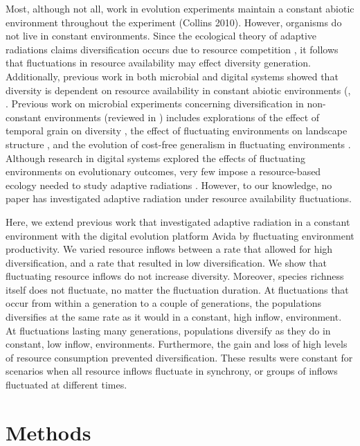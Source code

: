 \documentclass[10pt]{article}
\begin{document}
Most, although not all, work in evolution experiments maintain a constant abiotic environment throughout the experiment (Collins 2010).
However, organisms do not live in constant environments.
Since the ecological theory of adaptive radiations claims diversification occurs due to resource competition \cite{schluter2000ecological}, it follows that fluctuations in resource availability may effect diversity generation.
Additionally, previous work in both microbial and digital systems showed that diversity is dependent on resource availability in constant abiotic environments (\cite{kassen2000diversity}, \cite{chow2004adaptive}.
Previous work on microbial experiments concerning diversification in non-constant environments (reviewed in \cite{kassen2002experimental,kassen2009toward} ) includes explorations of the effect of temporal grain on diversity \cite{venail2011diversification}, the effect of fluctuating environments on landscape structure \cite{cooper2010experimental}, and the evolution of cost-free generalism in fluctuating environments \cite{buckling2007experimental}.
Although research in digital systems explored the effects of fluctuating environments on evolutionary outcomes, very few impose a resource-based ecology needed to study adaptive radiations \cite{li2004digital,clune2007investigating,misevic2010experiments}.
However, to our knowledge, no paper has investigated adaptive radiation under resource availability fluctuations.

Here, we extend previous work that investigated adaptive radiation in a constant environment with the digital evolution platform Avida \cite{chow2004adaptive} by fluctuating environment productivity.
We varied resource inflows between a rate that allowed for high diversification, and a rate that resulted in low diversification.
We show that fluctuating resource inflows do not increase diversity.
Moreover, species richness itself does not fluctuate, no matter the fluctuation duration.
At fluctuations that occur from within a generation to a couple of generations, the populations diversifies at the same rate as it would in a constant, high inflow, environment.
At fluctuations lasting many generations, populations diversify as they do in constant, low inflow, environments.
Furthermore, the gain and loss of high levels of resource consumption prevented diversification.
These results were constant for scenarios when all resource inflows fluctuate in synchrony, or groups of inflows fluctuated at different times. 

\section{Methods}
\end{document}
